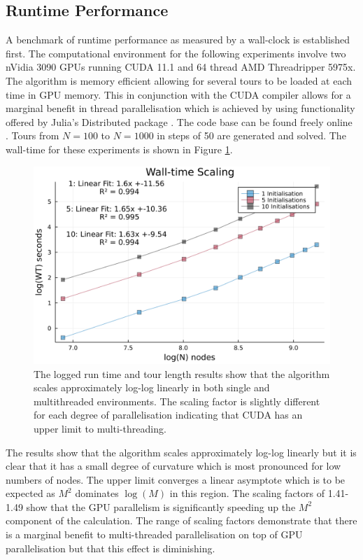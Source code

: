 \subsection{Runtime Performance}
A benchmark of runtime performance as measured by a wall-clock is established first. The computational environment for the following experiments involve two nVidia 3090 GPUs running CUDA 11.1 and 64 thread AMD Threadripper 5975x. The algorithm is memory efficient allowing for several tours to be loaded at each time in GPU memory. This in conjunction with the CUDA compiler allows for a marginal benefit in thread parallelisation which is achieved by using functionality offered by Julia's Distributed package \cite{Distributed}. The code base can be found freely online . Tours from $N = 100$ to $N = 1000$ in steps of 50 are generated and solved. The wall-time for these experiments is shown in Figure \ref{fig:ENwalltime}.
\begin{figure}[h]
	\centering
	\includegraphics[width=\textwidth]{images/elastic_neighbourhood/fig_scaling_runtime}
	\def\c{The logged run time and tour length results show that the algorithm scales approximately log-log linearly in both single and multithreaded environments. }
	\caption[\c]{\label{fig:ENwalltime} \c The scaling factor is slightly different for each degree of parallelisation indicating that CUDA has an upper limit to multi-threading.}
\end{figure}

The results show that the algorithm scales approximately log-log linearly but it is clear that it has a small degree of curvature which is most pronounced for low numbers of nodes. The upper limit converges a linear asymptote which is to be expected as $M^2$ dominates $\log(M)$ in this region. The scaling factors of 1.41-1.49 show that the GPU parallelism is significantly speeding up the $M^2$ component of the calculation. The range of scaling factors demonstrate that there is a marginal benefit to multi-threaded parallelisation on top of GPU parallelisation but that this effect is diminishing.
\newpage

